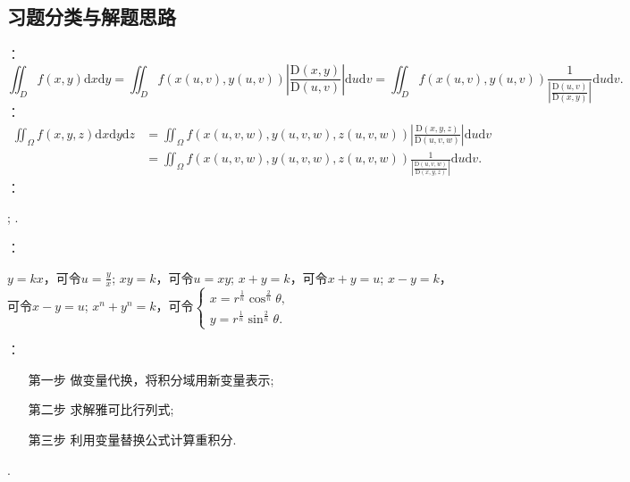 \documentclass[12pt,UTF8]{ctexart}
\begin{document}
\subsection{习题分类与解题思路}
\begin{enumerate}
：
\[
\iint_Df(x,y)\mathrm dx\mathrm dy=\iint_Df(x(u,v),y(u,v))|\frac{\mathrm D(x,y)}{\mathrm D(u,v)}|\mathrm du\mathrm dv=\iint_Df(x(u,v),y(u,v))\frac1{|\frac{\mathrm D(u,v)}{\mathrm D(x,y)}|}\mathrm du\mathrm dv.
\]
：
\[\begin{aligned}
\iint_\Omega f(x,y,z)\mathrm dx\mathrm dy\mathrm dz&=\iint_\Omega f(x(u,v,w),y(u,v,w),z(u,v,w))|\frac{\mathrm D(x,y,z)}{\mathrm D(u,v,w)}|\mathrm du\mathrm dv\\
&=\iint_\Omega f(x(u,v,w),y(u,v,w),z(u,v,w))\frac1{|\frac{\mathrm D(u,v,w)}{\mathrm D(x,y,z)}|}\mathrm du\mathrm dv.
\end{aligned}\]
：
\begin{enumerate}
;
.
\end{enumerate}
：
\begin{enumerate}
$y=kx$，可令$u=\frac yx$;
$xy=k$，可令$u=xy$;
$x+y=k$，可令$x+y=u$;
$x-y=k$，可令$x-y=u$;
$x^n+y^n=k$，可令$\begin{cases}x=r^{\frac1n}\cos^{\frac2n}\theta,\\ y=r^{\frac1n}\sin^{\frac2n}\theta.\end{cases}$
\end{enumerate}
：
\begin{enumerate}
\item[第一步]做变量代换，将积分域用新变量表示;
\item[第二步]求解雅可比行列式;
\item[第三步]利用变量替换公式计算重积分.
\end{enumerate}
.
\end{enumerate}
\end{document}
